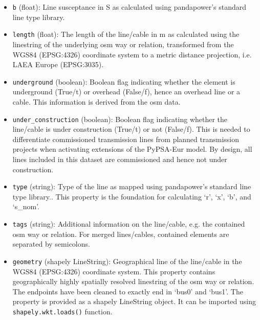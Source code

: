 \documentclass[fleqn,10pt]{wlscirep}
\let\autocite\cite
\newcommand{\colorcode}[1]{\colorbox{gray!20}{\lstinline|#1|}}
\begin{document}
\begin{itemize}
    \item \colorcode{b} (float): Line susceptance in \si{\siemens} as calculated using pandapower's standard line type library.\autocite{thurnerPandapowerOpenSourcePython2018}
    \item \colorcode{length} (float): The length of the line/cable in \si{\meter} as calculated using the linestring of the underlying \acrshort{osm} way or relation, transformed from the WGS84 (EPSG:4326) coordinate system to a metric distance projection, i.e. LAEA Europe (EPSG:3035).
    \item \colorcode{underground} (boolean): Boolean flag indicating whether the element is underground (True/t) or overhead (False/f), hence an overhead line or a cable. This information is derived from the \acrshort{osm} data.
    \item \colorcode{under_construction} (boolean): Boolean flag indicating whether the line/cable is under construction (True/t) or not (False/f). This is needed to differentiate commissioned transmission lines from planned transmission projects when activating extensions of the PyPSA-Eur model. By design, all lines included in this dataset are commissioned and hence not under construction.
    \item \colorcode{type} (string): Type of the line as mapped using pandapower's standard line type library.\autocite{thurnerPandapowerOpenSourcePython2018}. This property is the foundation for calculating `r', `x', `b', and `s\_nom'.
    \item \colorcode{tags} (string): Additional information on the line/cable, e.g. the contained \acrshort{osm} way or relation. For merged lines/cables, contained elements are separated by semicolons.
    \item \colorcode{geometry} (shapely LineString): Geographical line of the line/cable in the WGS84 (EPSG:4326) coordinate system. This property contains geographically highly spatially resolved linestring of the \acrshort{osm} way or relation. The endpoints have been cleaned to exactly end in `bus0' and `bus1'. The property is provided as a shapely LineString object.\cite{gilliesShapely2024} It can be imported using \colorcode{shapely.wkt.loads()} function.
\end{itemize}
\end{document}
